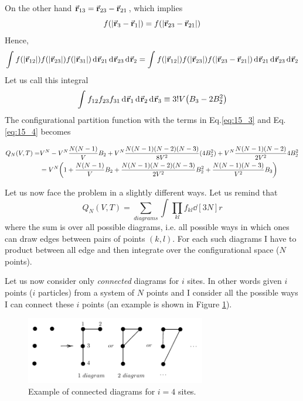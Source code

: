 \documentclass[../main/main.tex]{subfiles}
\begin{document}
\noindent On the other hand \( \va{r}_{13} = \va{r}_{23} - \va{r}_{21} \), which implies
\begin{equation*}
   f ( \abs{\va{r}_3 - \va{r}_1} )  =  f ( \abs{\va{r}_{23} - \va{r}_{21}} )
\end{equation*}
Hence,
\begin{equation*}
  \int_{}^{} f (\abs{\va{r}_{12}} ) f (\abs{\va{r}_{23}} ) f (\abs{\va{r}_{31}} ) \dd[]{\va{r}_{21}}  \dd[]{\va{r}_{23}}  \dd[]{\va{r}_{2}}
   =  \int_{}^{} f (\abs{\va{r}_{12}} ) f (\abs{\va{r}_{23}} ) f (\abs{\va{r}_{23}-\va{r}_{21}} )  \dd[]{\va{r}_{21}}  \dd[]{\va{r}_{23}}  \dd[]{\va{r}_{2}}
\end{equation*}
Let us call this integral
\begin{equation}
  \int_{}^{} f_{12} f_{23} f_{31} \dd[]{\va{r}_1}  \dd[]{\va{r}_2}   \dd[]{\va{r}_3}
  \equiv  3! V  \qty( B_3 - 2 B_2^2  )
  \label{eq:15_4}
\end{equation}
The configurational partition function with the terms in Eq.\ref{eq:15_3} and Eq.\ref{eq:15_4} becomes
\begin{small}
\begin{equation}
\begin{split}
Q_N (V,T) = &  V^N - V^N \frac{N(N-1)}{V} B_2 + V^N\frac{ N (N-1)(N-2)(N-3)}{8V^2} (4B_2^2)
 + V^N \frac{N(N-1)(N-2)}{2V^2} 4B_2^2 \\
& = V^N \qty(1 + \frac{N(N-1)}{V} B_2 + \frac{N(N-1)(N-2)(N-3)}{2V^2} B_2^2 + \frac{N(N-1)(N-3)}{V^2} B_3)
\end{split}
\end{equation}
\end{small}

Let us now face the problem in a slightly different ways. Let us remind that
\begin{equation}
  Q_N (V,T) = \sum_{diagrams}^{} \int_{}^{} \prod_{kl}^{} f_{kl} \dd[3N]{r}
\end{equation}
where the sum is over all possible diagrams, i.e. all possible ways in which ones can draw edges between pairs of points \( (k,l) \).
For each such diagrams I have to product between all edge and then integrate over the configurational space (\( N \)  points).

 Let us now consider only \emph{connected} diagrams for \( i \) sites. In other words given \( i \) points (\( i \) particles)  from a system of \( N \) points and I consider all the possible ways I can connect these \( i  \) points (an example is shown in Figure \ref{fig:15_6}).
\begin{figure}[h!]
   \centering
   \includegraphics[width=0.7\textwidth]{../lessons/15_image/9.pdf}
   \caption{\label{fig:15_6} Example of connected diagrams for \( i=4 \) sites.}
   \end{figure}
\end{document}
